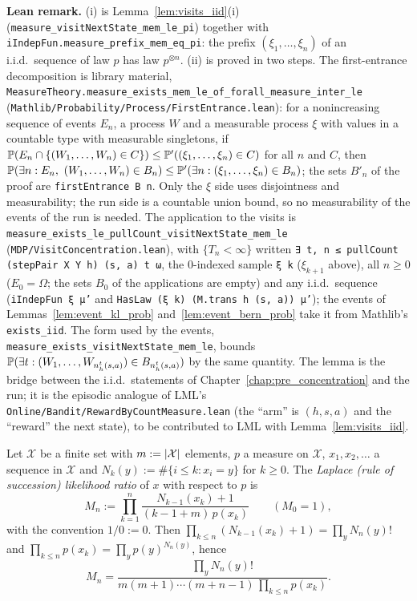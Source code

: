 \textbf{Lean remark.} (i) is Lemma~\ref{lem:visits_iid}(i) (\texttt{measure\_visitNextState\_mem\_le\_pi})
together with \texttt{iIndepFun.measure\_prefix\_mem\_eq\_pi}: the prefix $(\xi_1, \dots, \xi_n)$ of an
i.i.d.\ sequence of law $p$ has law $p^{\otimes n}$. (ii) is proved in two steps. The
first-entrance decomposition is library material,
\texttt{MeasureTheory.measure\_exists\_mem\_le\_of\_forall\_measure\_inter\_le}
(\texttt{Mathlib/Probability/Process/FirstEntrance.lean}): for a nonincreasing sequence of events
$E_n$, a process $W$ and a measurable process $\xi$ with values in a countable type with
measurable singletons, if $\mathbb{P}(E_n \cap \{(W_1, \dots, W_n) \in C\}) \le \mathbb{P}'((\xi_1, \dots, \xi_n) \in C)$
for all $n$ and $C$, then $\mathbb{P}(\exists n : E_n,\ (W_1, \dots, W_n) \in B_n) \le \mathbb{P}'(\exists n : (\xi_1, \dots, \xi_n) \in B_n)$;
the sets $B'_n$ of the proof are \texttt{firstEntrance B n}. Only the $\xi$ side uses disjointness
and measurability; the run side is a countable union bound, so no measurability of the events of
the run is needed. The application to the visits is
\texttt{measure\_exists\_le\_pullCount\_visitNextState\_mem\_le} (\texttt{MDP/VisitConcentration.lean}),
with $\{T_n < \infty\}$ written \texttt{∃ t, n ≤ pullCount (stepPair X Y h) (s, a) t ω}, the
$0$-indexed sample \texttt{ξ k} ($\xi_{k+1}$ above), all $n \ge 0$ ($E_0 = \Omega$; the sets $B_0$
of the applications are empty) and any i.i.d.\ sequence (\texttt{iIndepFun ξ μ'} and
\texttt{HasLaw (ξ k) (M.trans h (s, a)) μ'}); the events of Lemmas~\ref{lem:event_kl_prob}
and~\ref{lem:event_bern_prob} take it from Mathlib's \texttt{exists\_iid}. The form used by the
events, \texttt{measure\_exists\_visitNextState\_mem\_le}, bounds
$\mathbb{P}(\exists t : (W_1, \dots, W_{n^t_h(s, a)}) \in B_{n^t_h(s, a)})$ by the same quantity. The
lemma is the bridge between the i.i.d.\ statements of Chapter~\ref{chap:pre_concentration} and the
run; it is the episodic analogue of LML's \texttt{Online/Bandit/RewardByCountMeasure.lean} (the
``arm'' is $(h, s, a)$ and the ``reward'' the next state), to be contributed to LML with
Lemma~\ref{lem:visits_iid}.

\begin{lemma}\label{lem:emp_laplace_product}
\leanok
Let $\mathcal X$ be a finite set with $m := \lvert \mathcal X \rvert$ elements, $p$ a measure on
$\mathcal X$, $x_1, x_2, \dots$ a sequence in $\mathcal X$ and $N_k(y) := \#\{i \le k : x_i = y\}$
for $k \ge 0$. The \emph{Laplace (rule of succession) likelihood ratio} of $x$ with respect to $p$
is
\[
  M_n := \prod_{k = 1}^{n} \frac{N_{k-1}(x_k) + 1}{(k - 1 + m)\, p(x_k)} \qquad (M_0 = 1),
\]
with the convention $1/0 := 0$. Then $\prod_{k \le n} (N_{k-1}(x_k) + 1) = \prod_{y} N_n(y)!$ and
$\prod_{k \le n} p(x_k) = \prod_y p(y)^{N_n(y)}$, hence
\[
  M_n = \frac{\prod_y N_n(y)!}{m (m + 1) \cdots (m + n - 1)\, \prod_{k \le n} p(x_k)} .
\]
\end{lemma}

